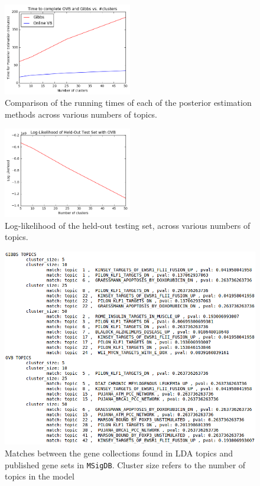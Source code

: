 \documentclass{article}
\begin{document}
\begin{figure}
    \centering
    \includegraphics[width=0.5\textwidth]{figs/time}
    \caption{Comparison of the running times of each of the posterior estimation methods across various numbers of topics.}
    \label{fig:time}
\end{figure}

\begin{figure}
    \centering
    \includegraphics[width=0.5\textwidth]{figs/ll}
    \caption{Log-likelihood of the held-out testing set, across various numbers of topics.}
    \label{fig:ll}
\end{figure}

\begin{figure}
    \centering
    \includegraphics[width=1\textwidth]{figs/pathways}
    \caption{Matches between the gene collections found in LDA topics and published gene sets in \texttt{MSigDB}. Cluster size refers to the number of topics in the model}
    \label{fig:pathways}
\end{figure}
\end{document}
